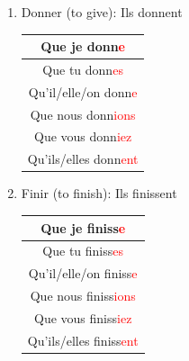 \documentclass{book}
\begin{document}
        \begin{enumerate}
            \item Donner (to give): Ils donnent
                \begin{center}
                    \begin{tabular}{|c|}
                        \hline
                        Que je donn\textcolor{red}{e} \\
                        \hline  
                        Que tu donn\textcolor{red}{es} \\
                        \hline
                        Qu'il/elle/on donn\textcolor{red}{e} \\
                        \hline
                        Que nous donn\textcolor{red}{ions} \\
                        \hline
                        Que vous donn\textcolor{red}{iez} \\
                        \hline
                        Qu'ils/elles donn\textcolor{red}{ent} \\
                        \hline
                    \end{tabular}
                \end{center}

            \item Finir (to finish): Ils finissent
                \begin{center}
                    \begin{tabular}{|c|}
                        \hline
                        Que je finiss\textcolor{red}{e} \\
                        \hline  
                        Que tu finiss\textcolor{red}{es} \\
                        \hline
                        Qu'il/elle/on finiss\textcolor{red}{e} \\
                        \hline
                        Que nous finiss\textcolor{red}{ions} \\
                        \hline
                        Que vous finiss\textcolor{red}{iez} \\
                        \hline
                        Qu'ils/elles finiss\textcolor{red}{ent} \\
                        \hline
                    \end{tabular}
                \end{center}


\end{enumerate}
\end{document}
